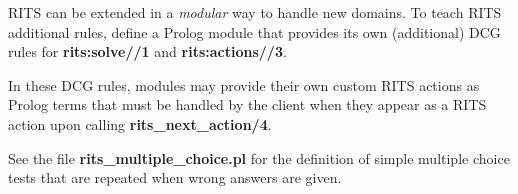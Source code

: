 \documentclass[a4paper,11pt]{article}
\begin{document}
RITS can be extended in a \textit{modular} way to handle new domains.
To teach RITS additional rules, define a Prolog module that provides
its own (additional) DCG rules for \textbf{rits:solve//1} and
\textbf{rits:actions//3}. 

In these DCG rules, modules may provide their own custom RITS actions
as Prolog terms that must be handled by the client when they appear as
a RITS action upon calling \textbf{rits\_next\_action/4}.

See the file \textbf{rits\_multiple\_choice.pl} for the definition of
simple multiple choice tests that are repeated when wrong answers are
given.


\vfil
\end{document}
